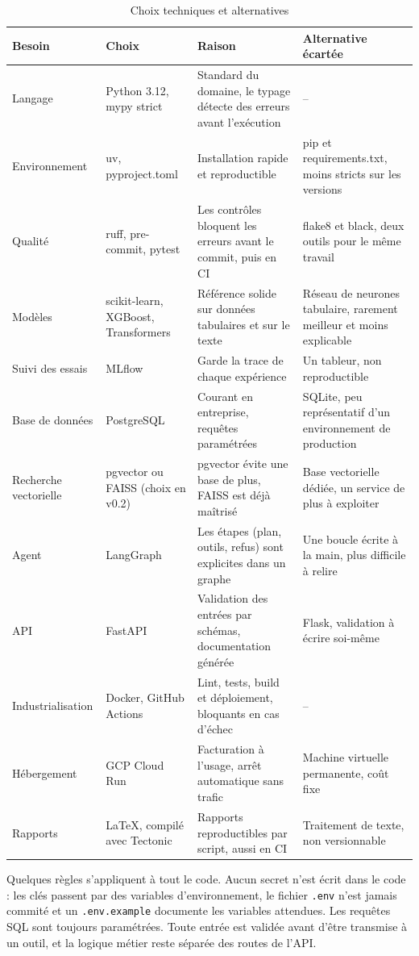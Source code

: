 \documentclass[11pt,a4paper]{article}
\begin{document}
\begin{table}[H]
\centering\small
\begin{tabularx}{\linewidth}{@{}l Y Y Y@{}}
\toprule
Besoin & Choix & Raison & Alternative écartée \\
\midrule
Langage & Python 3.12, mypy strict & Standard du domaine, le typage détecte des erreurs avant l'exécution & -- \\
Environnement & uv, pyproject.toml & Installation rapide et reproductible & pip et requirements.txt, moins stricts sur les versions \\
Qualité & ruff, pre-commit, pytest & Les contrôles bloquent les erreurs avant le commit, puis en CI & flake8 et black, deux outils pour le même travail \\
Modèles & scikit-learn, XGBoost, Transformers & Référence solide sur données tabulaires et sur le texte & Réseau de neurones tabulaire, rarement meilleur et moins explicable \\
Suivi des essais & MLflow & Garde la trace de chaque expérience & Un tableur, non reproductible \\
Base de données & PostgreSQL & Courant en entreprise, requêtes paramétrées & SQLite, peu représentatif d'un environnement de production \\
Recherche vectorielle & pgvector ou FAISS (choix en v0.2) & pgvector évite une base de plus, FAISS est déjà maîtrisé & Base vectorielle dédiée, un service de plus à exploiter \\
Agent & LangGraph & Les étapes (plan, outils, refus) sont explicites dans un graphe & Une boucle écrite à la main, plus difficile à relire \\
API & FastAPI & Validation des entrées par schémas, documentation générée & Flask, validation à écrire soi-même \\
Industrialisation & Docker, GitHub Actions & Lint, tests, build et déploiement, bloquants en cas d'échec & -- \\
Hébergement & GCP Cloud Run & Facturation à l'usage, arrêt automatique sans trafic & Machine virtuelle permanente, coût fixe \\
Rapports & LaTeX, compilé avec Tectonic & Rapports reproductibles par script, aussi en CI & Traitement de texte, non versionnable \\
\bottomrule
\end{tabularx}
\caption{Choix techniques et alternatives}
\end{table}

Quelques règles s'appliquent à tout le code. Aucun secret n'est écrit dans le code : les clés passent par des variables d'environnement, le fichier \texttt{.env} n'est jamais commité et un \texttt{.env.example} documente les variables attendues. Les requêtes SQL sont toujours paramétrées. Toute entrée est validée avant d'être transmise à un outil, et la logique métier reste séparée des routes de l'API.
\end{document}
